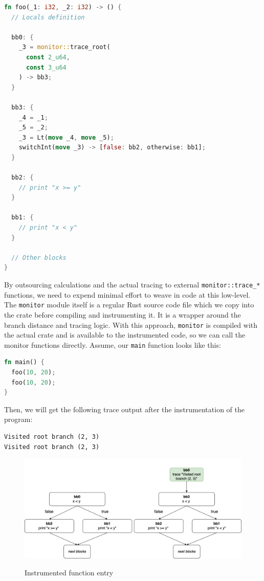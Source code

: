 \documentclass[paper=a4,%
  twoside,%
  BCOR4mm,%
  abstract=true,%
  toc=bibliography,%
  chapterprefix=true,%
  toc=bibliographynumbered,%
  open=right,%
  english,%
  pagesize=pdftex]{scrreprt}
\begin{document}
\begin{lstlisting}[language=Rust, style=boxed, caption={}, label=lst:mir-instrument-root]
fn foo(_1: i32, _2: i32) -> () {
  // Locals definition

  bb0: {
    _3 = monitor::trace_root(
      const 2_u64, 
      const 3_u64
    ) -> bb3;
  }

  bb3: {
    _4 = _1;
    _5 = _2;
    _3 = Lt(move _4, move _5);
    switchInt(move _3) -> [false: bb2, otherwise: bb1];
  }

  bb2: {
    // print "x >= y"
  }

  bb1: {
    // print "x < y"
  }

  // Other blocks
}
\end{lstlisting}

By outsourcing calculations and the actual tracing to external \lstinline{monitor::trace_*} functions, we need to expend minimal effort to weave in code at this low-level. The \lstinline{monitor} module itself is a regular Rust source code file which we copy into the crate before compiling and instrumenting it. It is a wrapper around the branch distance and tracing logic. With this approach, \lstinline{monitor} is compiled with the actual crate and is available to the instrumented code, so we can call the monitor functions directly. Assume, our \lstinline{main} function looks like this:
\begin{lstlisting}[language=Rust, style=boxed, caption={}]
fn main() {
  foo(10, 20);
  foo(10, 20);
}
\end{lstlisting}

Then, we will get the following trace output after the instrumentation of the program:

\begin{lstlisting}[language={}, style=boxed, caption={}]
Visited root branch (2, 3)
Visited root branch (2, 3)
\end{lstlisting}

\begin{figure}[h]
\caption{Instrumented function entry}
\centering
\includegraphics[width=\textwidth]{comparison-instrumented-fn-entry}
\label{fig:comparison-instrumented-fn-entry}
\end{figure}
\end{document}
